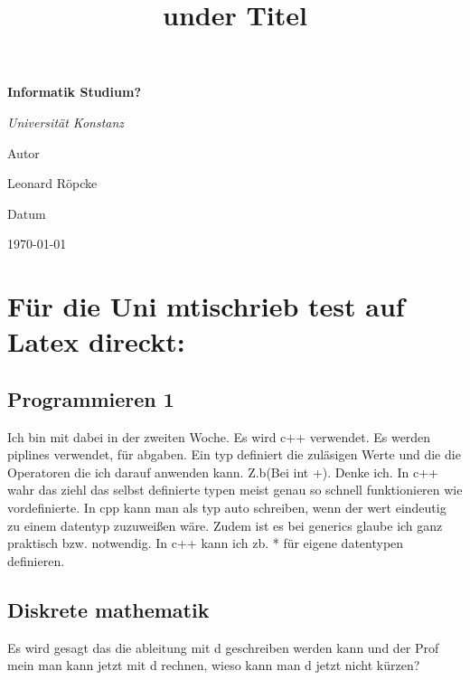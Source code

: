 \documentclass{article}
\title{under Titel}
\newcommand{\AuthorName}{Leonard Röpcke}
\newcommand{\Institute}{}
\newcommand{\header}{Informatik Studium?}
\newcommand{\Subtitle}{Universität Konstanz}
\newcommand{\MyDate}{\today}
\begin{document}
\begin{titlepage}
  \centering
  {\scshape\LARGE \Institute \par}
  \vspace{2.5cm}
  {\huge\bfseries \header \par}
  \vspace{0.8cm}
  {\Large\itshape \Subtitle \par}
  \vfill
  {\Large Autor\par}
  {\Large \AuthorName \par}
  \vspace{1cm}
  {\Large Datum\par}
  {\Large \MyDate \par}
  \vfill
  \vspace{1cm}
  {\small }
\end{titlepage}
\section*{Für die Uni mtischrieb test auf Latex direckt:}
\subsection{Programmieren 1}
Ich bin mit dabei in der zweiten Woche. Es wird c++ verwendet. Es werden piplines verwendet, für abgaben.
Ein typ definiert die zuläsigen Werte und die die Operatoren die ich darauf anwenden kann. Z.b(Bei int +). Denke ich.
In c++ wahr das ziehl das selbst definierte typen meist genau so schnell funktionieren wie vordefinierte.
In cpp kann man als typ auto schreiben, wenn der wert eindeutig zu einem datentyp zuzuweißen wäre. Zudem ist es bei 
generics glaube ich ganz praktisch bzw. notwendig. In c++ kann ich zb. * für eigene datentypen definieren.
\subsection{Diskrete mathematik}
Es wird gesagt das die ableitung mit d geschreiben werden kann und der Prof mein man kann jetzt mit d rechnen, wieso kann man d jetzt nicht kürzen?
\end{document}
